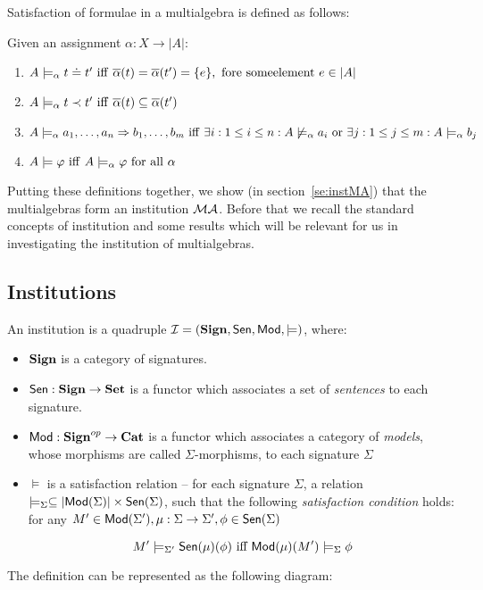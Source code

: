 Satisfaction of formulae in a multialgebra is defined as follows:
\begin{definition}\label{de:sat}
Given an assignment $\alpha:X\to|A|$:
\begin{enumerate}
\item $A \models_\alpha t \mathrel{\dot{=} }  t'\ {\rm iff\ } \overline{\alpha}(t)
=\overline{\alpha}(t') = \{e\},\ {\rm fore\ some element\ } e \in |A|$
\item $A \models_\alpha t \prec t'\ {\rm iff\ } \ovr{\alpha}(t) \subseteq \overline{\alpha}(t')$
\item $ A \models_\alpha a_1 , \ldots ,a_n \Rightarrow  b_1 , \ldots ,b_m\ {\rm iff\ }
\exists i: 1 \leq i \leq n : A \not\models_\alpha a_i\ {\rm or\ } \exists j: 1 \leq j \leq m : A \models_\alpha b_j$
\item $A \models \varphi\ {\rm iff\ } A \models_\alpha \varphi\ {\rm for\ all\ } \alpha$
\end{enumerate}
\end{definition}
%
Putting these definitions together, we show (in section~\ref{se:instMA}) that
the multialgebras form an institution ${\mathcal{MA}}$. Before that we recall the
standard concepts of institution and some results which will be relevant for
us in investigating the institution of multialgebras.

 

\subsection{Institutions}\label{se:inst}

\begin{definition}\label{de:inst} \cite{inst} 
An institution is a quadruple ${\mathcal{I}} = ({\bf Sign},{\sf {Sen}},{\sf {Mod}},\models)$, where:
	\begin{itemize}
\item ${\bf Sign}$ is a category of signatures.  
\item ${\sf {Sen}}: {\bf Sign} \to {\bf Set}$ is a functor which associates a set of {\it sentences} to each signature.
\item ${\sf {Mod}}:{\bf Sign}^{op} \to {\bf Cat}$ is a functor which associates a
category of {\it models}, whose morphisms are called $\Sigma$-morphisms, to
each signature $\Sigma$
\item $\models$ is a satisfaction relation -- for each signature $\Sigma$, a relation
 $\models_{\Sigma} \subseteq |{\sf {Mod}}(\Sigma)| \times
{\sf {Sen}}(\Sigma)$, such that the following {\it satisfaction condition} holds:
for any $M' \in {\sf {Mod}}(\Sigma'), \mu: \Sigma \to \Sigma' , \phi \in {\sf {Sen}}(\Sigma)$
 
  \[ M' \models_{\Sigma'} {\sf {Sen}}(\mu)(\phi) \mbox{ iff } {\sf {Mod}}(\mu)(M') \models_{\Sigma} \phi\]
	\end{itemize}
\end{definition}
%
The definition can be represented as the following diagram:

